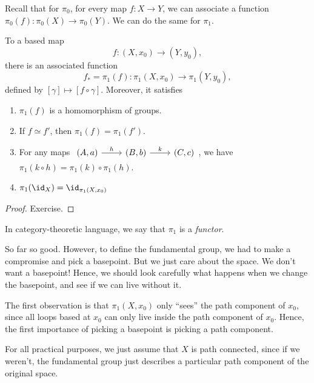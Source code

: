 \documentclass[a4paper]{article}
\begin{document}
Recall that for $\pi_0$, for every map $f: X\to Y$, we can associate a function $\pi_0(f): \pi_0(X) \to \pi_0(Y)$. We can do the same for $\pi_1$.
\begin{prop}
  To a based map
  \[
    f: (X, x_0) \to (Y, y_0),
  \]
  there is an associated function
  \[
    f_* = \pi_1(f): \pi_1(X, x_0) \to \pi_1(Y, y_0),
  \]
  defined by $[\gamma] \mapsto [f\circ \gamma]$. Moreover, it satisfies
  \begin{enumerate}
    \item $\pi_1(f)$ is a homomorphism of groups.
    \item If $f \simeq f'$, then $\pi_1(f) = \pi_1(f')$.
    \item For any maps $\begin{tikzcd} (A, a) \ar[r, "h"] & (B, b) \ar[r, "k"] & (C, c) \end{tikzcd}$, we have $\pi_1(k\circ h) = \pi_1(k)\circ \pi_1 (h)$.
    \item $\pi_1(\id_X) = \id_{\pi_1(X, x_0)}$
  \end{enumerate}
\end{prop}

\begin{proof}
  Exercise. %
\end{proof}
In category-theoretic language, we say that $\pi_1$ is a \emph{functor}.

So far so good. However, to define the fundamental group, we had to make a compromise and pick a basepoint. But we just care about the space. We don't want a basepoint! Hence, we should look carefully what happens when we change the basepoint, and see if we can live without it.

The first observation is that $\pi_1(X, x_0)$ only ``sees'' the path component of $x_0$, since all loops based at $x_0$ can only live inside the path component of $x_0$. Hence, the first importance of picking a basepoint is picking a path component.

For all practical purposes, we just assume that $X$ is path connected, since if we weren't, the fundamental group just describes a particular path component of the original space.
\end{document}
